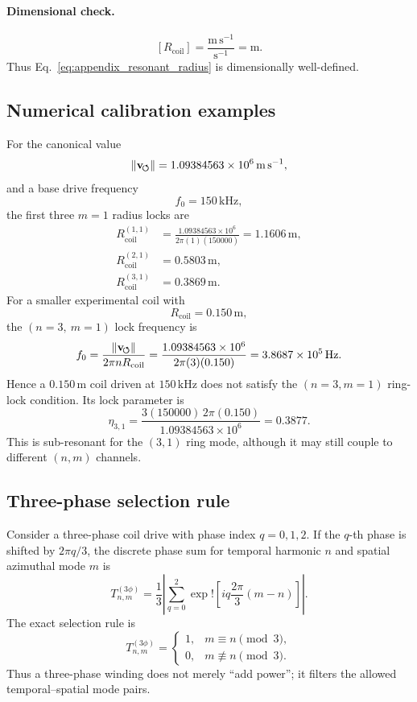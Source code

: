 \paragraph{Dimensional check.}
\[
[R_{\mathrm{coil}}]
=
\frac{\mathrm{m\,s^{-1}}}{\mathrm{s^{-1}}}
=
\mathrm{m}.
\]
Thus Eq.~\eqref{eq:appendix_resonant_radius} is dimensionally well-defined.

\subsection{Numerical calibration examples}

For the canonical value
\[
\lVert\mathbf{v}_{\!\boldsymbol{\circlearrowleft}}\rVert = 1.09384563\times10^6\,\mathrm{m\,s^{-1}},
\]
and a base drive frequency
\[
f_0 = 150\,\mathrm{kHz},
\]
the first three $m=1$ radius locks are
\begin{align}
R_{\mathrm{coil}}^{(1,1)}
&=
\frac{1.09384563\times10^6}{2\pi(1)(150000)}
=
1.1606\,\mathrm{m},
\\
R_{\mathrm{coil}}^{(2,1)}
&=
0.5803\,\mathrm{m},
\\
R_{\mathrm{coil}}^{(3,1)}
&=
0.3869\,\mathrm{m}.
\end{align}
For a smaller experimental coil with
\[
R_{\mathrm{coil}}=0.150\,\mathrm{m},
\]
the $(n=3,\ m=1)$ lock frequency is
\begin{equation}
f_0
=
\frac{\lVert\mathbf{v}_{\!\boldsymbol{\circlearrowleft}}\rVert}{2\pi n R_{\mathrm{coil}}}
=
\frac{1.09384563\times10^6}
{2\pi(3)(0.150)}
=
3.8687\times10^5\,\mathrm{Hz}.
\end{equation}
Hence a $0.150\,\mathrm{m}$ coil driven at $150\,\mathrm{kHz}$ does not satisfy the $(n=3,m=1)$ ring-lock condition. Its lock parameter is
\begin{equation}
\eta_{3,1}
=
\frac{3(150000)\,2\pi(0.150)}
{1.09384563\times10^6}
=
0.3877.
\end{equation}
This is sub-resonant for the $(3,1)$ ring mode, although it may still couple to different $(n,m)$ channels.

\subsection{Three-phase selection rule}

Consider a three-phase coil drive with phase index $q=0,1,2$. If the $q$-th phase is shifted by $2\pi q/3$, the discrete phase sum for temporal harmonic $n$ and spatial azimuthal mode $m$ is
\begin{equation}
T_{n,m}^{(3\phi)}
=
\frac{1}{3}
\left|
\sum_{q=0}^{2}
\exp!\left[
i q \frac{2\pi}{3}(m-n)
\right]
\right|.
\label{eq:appendix_three_phase_factor}
\end{equation}
The exact selection rule is
\begin{equation}
\boxed{
T_{n,m}^{(3\phi)}
=
\begin{cases}
1, & m\equiv n \pmod{3},\\
0, & m\not\equiv n \pmod{3}.
\end{cases}
}
\label{eq:appendix_three_phase_rule}
\end{equation}
Thus a three-phase winding does not merely ``add power''; it filters the allowed temporal--spatial mode pairs.

